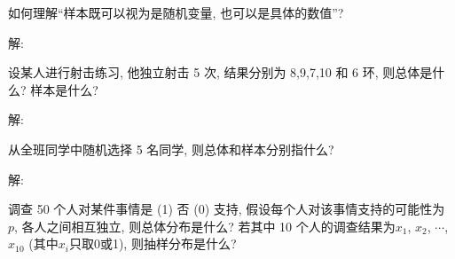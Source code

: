 \documentclass[standard]{ExBook}
\begin{document}
\begin{qitems}
    \begin{bbox}
    \begin{shaded}
        \qitem 
如何理解``样本既可以视为是随机变量, 也可以是具体的数值''?
    \end{shaded}
    \end{bbox}

\vspace{-5em}

    \begin{bbox}
解: 
    \end{bbox}

\vspace{-5em}

    \begin{bbox}
    \begin{shaded}
        \qitem
设某人进行射击练习, 他独立射击 5 次, 结果分别为 8,9,7,10 和 6 环, 则总体是什么? 样本是什么?
    \end{shaded}
    \end{bbox}

\vspace{-5em}

    \begin{bbox}
解: 
    \end{bbox}

\vspace{-5em}

    \begin{bbox}
    \begin{shaded}
        \qitem
从全班同学中随机选择 5 名同学, 则总体和样本分别指什么?
    \end{shaded}
    \end{bbox}

\vspace{-5em}

    \begin{bbox}
解: 
    \end{bbox}

\vspace{-5em}

    \begin{bbox}
    \begin{shaded}
        \qitem
调查 50 个人对某件事情是 (1) 否 (0) 支持, 假设每个人对该事情支持的可能性为 $p$, 各人之间相互独立, 则总体分布是什么? 若其中 10 个人的调查结果为$x_1$, $x_2$, $\cdots$, $x_{10}$ (其中$x_i$只取0或1), 则抽样分布是什么?
    \end{shaded}
    \end{bbox}


\end{qitems}
\end{document}
